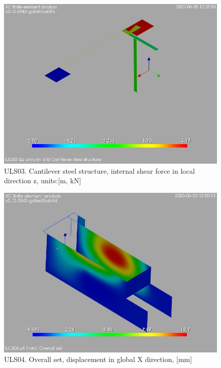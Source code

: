 \begin{figure}
\begin{center}
\includegraphics[width=\linewidth]{ramp_wall/resLC/text/graphics/resSimplLC/lULS03steelMembersQz}
\caption{ULS03. Cantilever steel structure, internal shear force in local direction z, units:[m, kN]}
\end{center}
\end{figure}
\clearpage
\begin{figure}
\begin{center}
\includegraphics[width=\linewidth]{ramp_wall/resLC/text/graphics/resSimplLC/lULS04overallSetuX}
\caption{ULS04. Overall set, displacement in global X direction, [mm]}
\end{center}
\end{figure}
